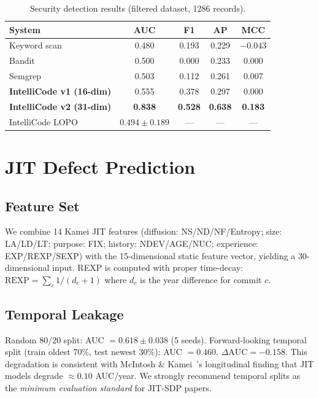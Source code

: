 \documentclass[conference]{IEEEtran}
\begin{document}
\begin{table}[t]
\caption{Security detection results (filtered dataset, 1286 records).}
\label{tab:security}
\centering
\begin{tabular}{lcccc}
\toprule
System & AUC & F1 & AP & MCC \\
\midrule
Keyword scan      & 0.480 & 0.193 & 0.229 & $-0.043$ \\
Bandit            & 0.500 & 0.000 & 0.233 & 0.000 \\
Semgrep           & 0.503 & 0.112 & 0.261 & 0.007 \\
\midrule
\textbf{IntelliCode v1 (16-dim)} & 0.555 & 0.378 & 0.297 & 0.000 \\
\textbf{IntelliCode v2 (31-dim)} & \textbf{0.838} & \textbf{0.528} & \textbf{0.638} & \textbf{0.183} \\
IntelliCode LOPO  & $0.494 \pm 0.189$ & --- & --- & --- \\
\bottomrule
\end{tabular}
\end{table}

\section{JIT Defect Prediction}
\label{sec:bugs}

\subsection{Feature Set}
We combine 14 Kamei JIT features \cite{kamei2013}
(diffusion: NS/ND/NF/Entropy; size: LA/LD/LT; purpose: FIX;
history: NDEV/AGE/NUC; experience: EXP/REXP/SEXP)
with the 15-dimensional static feature vector, yielding a 30-dimensional input.
REXP is computed with proper time-decay: $\text{REXP} = \sum_c 1/(d_c+1)$
where $d_c$ is the year difference for commit $c$.

\subsection{Temporal Leakage}
Random 80/20 split: AUC $= 0.618 \pm 0.038$ (5 seeds).
Forward-looking temporal split (train oldest 70\%, test newest 30\%):
AUC $= 0.460$.
$\Delta\text{AUC} = -0.158$.
This degradation is consistent with McIntosh \& Kamei~\cite{mcintosh2018}'s
longitudinal finding that JIT models degrade $\approx 0.10$ AUC/year.
We strongly recommend temporal splits as the \emph{minimum evaluation standard}
for JIT-SDP papers.
\end{document}
